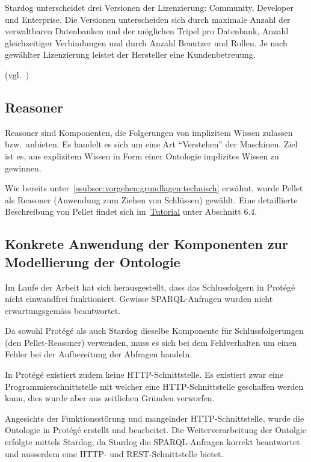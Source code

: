 Stardog unterscheidet drei Versionen der Lizenzierung: Community, Developer und Enterprise. Die Versionen unterscheiden sich durch maximale Anzahl der verwaltbaren Datenbanken und der möglichen Tripel pro Datenbank, Anzahl gleichzeitiger Verbindungen und durch Anzahl Benutzer und Rollen. Je nach gewählter Lizenzierung leistet der Hersteller eine Kundenbetreuung.

(vgl.~\cite{stardogDocu})

\subsection{Reasoner}
\label{subsec:komponenten_reasoner}
Reasoner sind Komponenten,  die Folgerungen von implizitem Wissen zulassen bzw.\ anbieten. Es handelt es sich um eine Art ``Verstehen'' der Maschinen. Ziel ist es, aus explizitem Wissen in Form einer Ontologie implizites Wissen zu gewinnen.

Wie bereits unter~\autoref{ssubsec:vorgehen:grundlagen:technisch} erwähnt, wurde Pellet als Reasoner (Anwendung zum Ziehen von Schlüssen) gewählt. Eine detaillierte Beschreibung von Pellet findet sich im~\hyperref[chap:tutorial]{Tutorial} unter Abschnitt 6.4.

\subsection{Konkrete Anwendung der Komponenten zur Modellierung der Ontologie}
\label{subsec:komponenten_anwendung}
Im Laufe der Arbeit hat sich herausgestellt, dass das Schlussfolgern in Protégé nicht einwandfrei funktioniert. Gewisse SPARQL-Anfragen wurden nicht erwartungsgemäss beantwortet.

Da sowohl Protégé als auch Stardog dieselbe Komponente für Schlussfolgerungen (den Pellet-Reasoner) verwenden, muss es sich bei dem Fehlverhalten um einen Fehler bei der Aufbereitung der Abfragen handeln.

In Protégé existiert zudem keine HTTP-Schnittstelle. Es existiert zwar eine Programmierschnittstelle mit welcher eine HTTP-Schnittstelle geschaffen werden kann, dies wurde aber aus zeitlichen Gründen verworfen.

Angesichts der Funktionsstörung und mangelnder HTTP-Schnittstelle, wurde die Ontologie in Protégé erstellt und bearbeitet. Die Weiterverarbeitung der Ontolgie erfolgte mittels Stardog, da Stardog die SPARQL-Anfragen korrekt beantwortet und ausserdem eine HTTP- und REST-Schnittstelle bietet.


